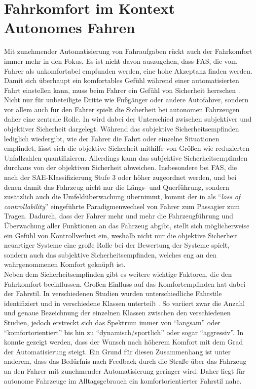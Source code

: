 \section{Fahrkomfort im Kontext Autonomes Fahren}\label{sec:fahrkomfort}
Mit zunehmender Automatisierung von Fahraufgaben rückt auch der Fahrkomfort immer mehr in den Fokus. Es ist nicht davon auszugehen, dass FAS, die vom Fahrer als unkomfortabel empfunden werden, eine hohe Akzeptanz finden werden. \\
Damit sich überhaupt ein komfortables Gefühl während einer automatisierten Fahrt einstellen kann, muss beim Fahrer ein Gefühl von Sicherheit herrschen \cite{Festner.2019}. Nicht nur für unbeteiligte Dritte wie Fußgänger oder andere Autofahrer, sondern vor allem auch für den Fahrer spielt die Sicherheit bei autonomen Fahrzeugen daher eine zentrale Rolle. In \cite{Festner.2019} wird dabei der Unterschied zwischen subjektiver und objektiver Sicherheit dargelegt. Während das subjektive Sicherheitsempfinden lediglich wiedergibt, wie der Fahrer die Fahrt oder einzelne Situationen empfindet, lässt sich die objektive Sicherheit mithilfe von Größen wie reduzierten Unfallzahlen quantifizieren. Allerdings kann das subjektive Sicherheitsempfinden durchaus von der objektiven Sicherheit abweichen. Insbesondere bei FAS, die nach der SAE-Klassifizierung \cite{SAE klassifizierung} Stufe 3 oder höher zugeordnet werden, und bei denen damit das Fahrzeug nicht nur die Längs- und Querführung, sondern zusätzlich auch die Umfeldüberwachung übernimmt, kommt der in \cite{Elbanhawi.2015} als ``\textit{loss of controllability}'' eingeführte Paradigmenwechsel von Fahrer zum Passagier zum Tragen. Dadurch, dass der Fahrer mehr und mehr die Fahrzeugführung und Überwachung aller Funktionen an das Fahrzeug abgibt, stellt sich möglicherweise ein Gefühl von Kontrollverlust ein, weshalb nicht nur die objektive Sicherheit neuartiger Systeme eine große Rolle bei der Bewertung der Systeme spielt, sondern auch das subjektive Sicherheitsempfinden, welches eng an den wahrgenommenen Komfort geknüpft ist. \\
Neben dem Sicherheitsempfinden gibt es weitere wichtige Faktoren, die den Fahrkomfort beeinflussen. Großen Einfluss auf das Komfortempfinden hat dabei der Fahrstil. In verschiedenen Studien wurden unterschiedliche Fahrstile identifiziert und in verschiedene Klassen unterteilt \cite{Abendroth, B.; Bruder, R in Handbuch Fahrerassistenzsysteme, Bellem, Murphey}\cite{Abendroth.2009}\cite{Bellem.2016}\cite{Murphey.30.03.200902.04.2009}. So variiert zwar die Anzahl und genaue Bezeichnung der einzelnen Klassen zwischen den verschiedenen Studien, jedoch erstreckt sich das Spektrum immer von ``langsam'' oder ``komfortorientiert'' bis hin zu ``dynamisch/sportlich'' oder sogar ``aggressiv''. In \cite{Lange}\Cite{Lange.2014} konnte gezeigt werden, dass der Wunsch nach höherem Komfort mit dem Grad der Automatisierung steigt. Ein Grund für diesen Zusammenhang ist unter anderem, dass das Bedürfnis nach Feedback durch die Straße über das Fahrzeug an den Fahrer mit zunehmender Automatisierung geringer wird. Daher liegt für autonome Fahrzeuge im Alltagsgebrauch ein komfortorientierter Fahrstil nahe. 

